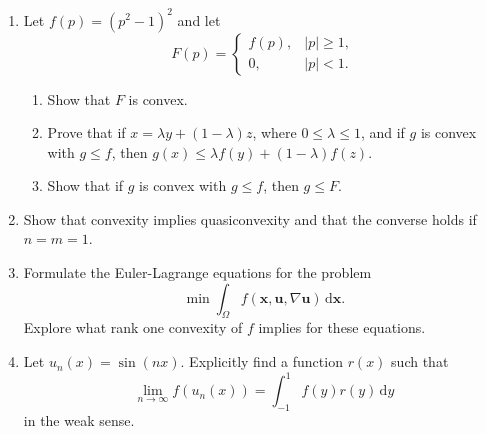 \begin{enumerate}[label=\thesection.\arabic*.,ref=\thesection.\arabic*,start=9,series=book-problems]
\item\label{ex:quartic-double-well-lower-convex-envelope} Let $f(p)=(p^2-1)^2$ and let
\begin{equation}\label{eq:quartic-double-well-convex-minorant}
F(p)=\begin{cases}f(p),&|p|\geq1,\\0,&|p|<1.\end{cases}
\end{equation}
\begin{enumerate}[label=\alph*.]\item Show that $F$ is convex.\item Prove that if $x=\lambda y+(1-\lambda)z$, where $0\leq\lambda\leq1$, and if $g$ is convex with $g\leq f$, then $g(x)\leq\lambda f(y)+(1-\lambda)f(z)$.\item Show that if $g$ is convex with $g\leq f$, then $g\leq F$.\end{enumerate}

\item\label{ex:convexity-implies-quasiconvexity-one-dimensional-converse} Show that convexity implies quasiconvexity and that the converse holds if $n=m=1$.

\item\label{ex:rank-one-convexity-euler-lagrange-implications} Formulate the Euler-Lagrange equations for the problem
\begin{equation}\label{eq:rank-one-convexity-euler-lagrange-exercise}
\min\int_\Omega f(\bm{x},\bm{u},\nabla\bm{u})\,\mathrm{d}\bm{x}.
\end{equation}
Explore what rank one convexity of $f$ implies for these equations.

\item\label{ex:sine-oscillation-young-measure-density} Let $u_n(x)=\sin(nx)$. Explicitly find a function $r(x)$ such that
\begin{equation}\label{eq:sine-oscillation-young-measure-density-exercise}
\lim_{n\to\infty}f(u_n(x))=\int_{-1}^1f(y)r(y)\,\mathrm{d}y
\end{equation}
in the weak sense.

\end{enumerate}
